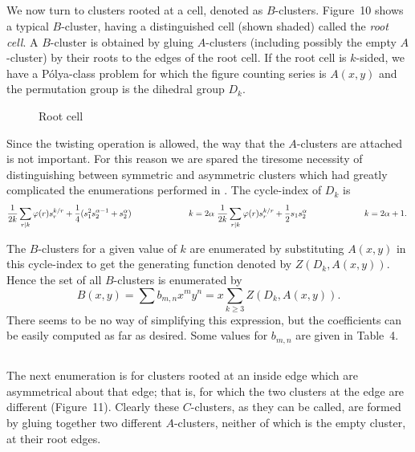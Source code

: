 \documentclass[10pt]{amsart}
\begin{document}
\subsection{}
We now turn to clusters rooted at a cell, denoted as $B$-clusters. Figure~10 shows a typical $B$-cluster, having a distinguished cell (shown shaded) called the {\em root cell}.  A $B$-cluster is obtained by gluing $A$-clusters (including possibly the empty $A$-cluster) by their roots to the edges of the root cell. If the root cell is $k$-sided, we have a P\'{o}lya-class problem for which the figure counting series is $A(x, y)$ and the permutation
group is the dihedral group $D_k$.

\begin{figure}[h]
    \caption{Root cell}
    \label{rootcell}
    \end{figure}
    
    Since the twisting operation is allowed, the way that the $A$-clusters are attached is not important.  For this reason we are spared the tiresome necessity of distinguishing between symmetric and asymmetric clusters which had greatly complicated the enumerations performed in \cite{r1}. The cycle-index of $D_k$ is
    \begin{eqnarray*}
    \frac{1}{2k}\sum_{r|k}\varphi(r)s_r^{k/r}+ \frac{1}{4}(s_1^2s_2^{\alpha-1}+s_2^\alpha) & \hspace{.8in} & k = 2\alpha \

    \frac{1}{2k}\sum_{r|k}\varphi(r)s_r^{k/r}+\frac{1}{2}s_1s_2^\alpha & \hspace{.8in} & k = 2\alpha + 1. \

    \end{eqnarray*}
    
    \vspace{-.2in}
    \noindent The $B$-clusters for a given value of $k$ are enumerated by substituting $A(x, y)$ in this cycle-index to get the generating function denoted by $Z(D_k, A(x,y))$.   Hence the set of all $B$-clusters is enumerated by
    $$B(x, y)  =  \sum b_{m,n} x^m y^n = x \sum_{k\geq 3} Z(D_k, A(x, y)).$$
    There seems to be no way of simplifying this expression, but the coefficients can be easily computed as far as desired.  Some values for $b_{m,n}$ are given in Table~4.
    
        
    \subsection{}
    The next enumeration is for clusters rooted at an inside edge which are asymmetrical about that edge; that is, for which the two clusters at the edge are different (Figure~11).  Clearly these $C$-clusters, as they can be called, are formed by gluing together two different $A$-clusters, neither of which is the empty cluster, at their root edges. 
    
\end{document}
